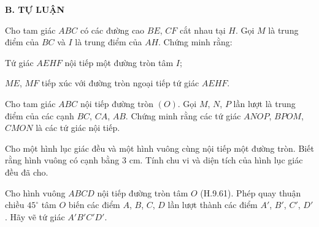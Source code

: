\begin{exercises}
    \textbf{B. TỰ LUẬN}

    \begin{questions}[resume=SGK]
        \item Cho tam giác $ABC$ có các đường cao $BE$, $CF$ cắt nhau tại $H$. Gọi $M$ là trung điểm của $BC$ và $I$ là trung điểm của $AH$. Chứng minh rằng:
        \begin{questions}
            \item Tứ giác $AEHF$ nội tiếp một đường tròn tâm $I$;
            \item $ME$, $MF$ tiếp xúc với đường tròn ngoại tiếp tứ giác $AEHF$.
        \end{questions}
        \answerline
        \answerline
        \answerline
        \answerline

        \item Cho tam giác $ABC$ nội tiếp đường tròn $(O)$. Gọi $M$, $N$, $P$ lần lượt là trung điểm của các cạnh $BC$, $CA$, $AB$. Chứng minh rằng các tứ giác $ANOP$, $BPOM$, $CMON$ là các tứ giác nội tiếp.
        \answerline
        \answerline
        \answerline
        \answerline

        \item Cho một hình lục giác đều và một hình vuông cùng nội tiếp một đường tròn. Biết rằng hình vuông có cạnh bằng $3$ cm. Tính chu vi và diện tích của hình lục giác đều đã cho.
        \answerline
        \answerline
        \answerline

        \item
        \begin{questions}
            \item Cho hình vuông $ABCD$ nội tiếp đường tròn tâm $O$ (H.9.61). Phép quay thuận chiều $45^\circ$ tâm $O$ biến các điểm $A$, $B$, $C$, $D$ lần lượt thành các điểm $A'$, $B'$, $C'$, $D'$. Hãy vẽ tứ giác $A'B'C'D'$.

            \begin{center}


\end{center}
\end{questions}
\end{questions}
\end{exercises}
